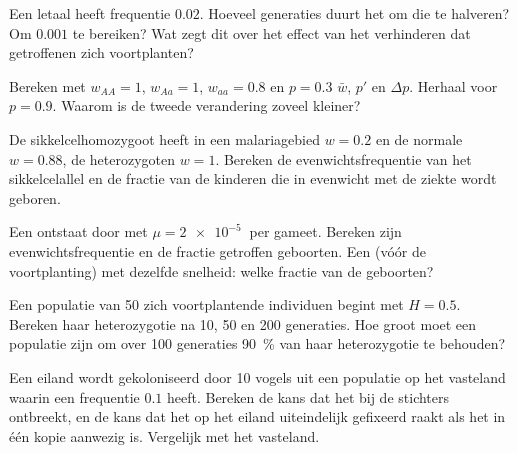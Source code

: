 \begin{exercise}[$\star\star$]\label{exo:b2:population-genetics:5}
Een letaal   heeft frequentie $0.02$. Hoeveel
generaties duurt het om die te halveren? Om $0.001$ te bereiken? Wat zegt dit
over het effect van het verhinderen dat getroffenen zich voortplanten?
\end{exercise}

\begin{exercise}[$\star\star$]\label{exo:b2:population-genetics:6}
Bereken met $w_{AA} = 1$, $w_{Aa} = 1$, $w_{aa} = 0.8$ en $p = 0.3$
$\bar w$, $p'$ en $\Delta p$. Herhaal voor $p = 0.9$. Waarom is de
tweede verandering zoveel kleiner?
\end{exercise}

\begin{exercise}[$\star\star$]\label{exo:b2:population-genetics:7}
De sikkelcelhomozygoot heeft in een malariagebied $w = 0.2$ en de normale
$w = 0.88$, de heterozygoten $w = 1$. Bereken de
evenwichtsfrequentie van het sikkelcelallel en de fractie van de kinderen die
in evenwicht met de ziekte wordt geboren.
\end{exercise}

\begin{exercise}[$\star\star$]\label{exo:b2:population-genetics:8}
Een   ontstaat door  met $\mu = \qty{2e-5}{}$ per
gameet. Bereken zijn evenwichtsfrequentie en de fractie getroffen geboorten.
Een   (vóór de voortplanting) met dezelfde snelheid:
welke fractie van de geboorten?
\end{exercise}

\begin{exercise}[$\star\star$]\label{exo:b2:population-genetics:9}
Een populatie van 50 zich voortplantende individuen begint met $H = 0.5$.
Bereken haar heterozygotie na 10, 50 en 200 generaties. Hoe
groot moet een populatie zijn om over 100 generaties \qty{90}{\%} van haar
heterozygotie te behouden?
\end{exercise}

\begin{exercise}[$\star\star\star$]\label{exo:b2:population-genetics:10}
Een eiland wordt gekoloniseerd door 10 vogels uit een populatie op het vasteland
waarin een  frequentie $0.1$ heeft. Bereken de kans dat
het  bij de stichters ontbreekt, en de kans dat het op het eiland
uiteindelijk gefixeerd raakt als het in één kopie aanwezig is.
Vergelijk met het vasteland.
\end{exercise}

